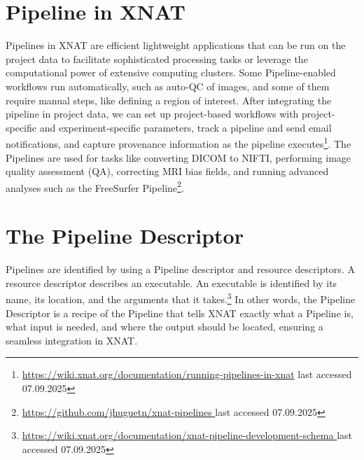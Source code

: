 \section{Pipeline in XNAT}
Pipelines in XNAT are efficient lightweight applications that can be run on the project data to facilitate sophisticated processing tasks or leverage the computational power of extensive computing clusters. Some Pipeline-enabled workflows run automatically, such as auto-QC of images, and some of them require manual steps, like defining a region of interest. After integrating the pipeline in project data, we can set up project-based workflows with project-specific and experiment-specific parameters, track a pipeline and send email notifications, and capture provenance information as the pipeline executes\footnote{\url{https://wiki.xnat.org/documentation/running-pipelines-in-xnat} { last accessed 07.09.2025}}. The Pipelines are used for tasks like converting DICOM to NIFTI, performing image quality assessment (QA), correcting MRI bias fields, and running advanced analyses such as the FreeSurfer Pipeline\footnote{\url{https://github.com/jhuguetn/xnat-pipelines }{ last accessed 07.09.2025}}.

\section{The Pipeline Descriptor}

Pipelines are identified by using a Pipeline descriptor and resource descriptors. A resource descriptor describes an executable. An executable is identified by its name, its location, and the arguments that it takes.\footnote{\url{https://wiki.xnat.org/documentation/xnat-pipeline-development-schema }{ last accessed 07.09.2025}} In other words, the Pipeline Descriptor is a recipe of the Pipeline that tells XNAT exactly what a Pipeline is, what input is needed, and where the output should be located, ensuring a seamless integration in XNAT.








